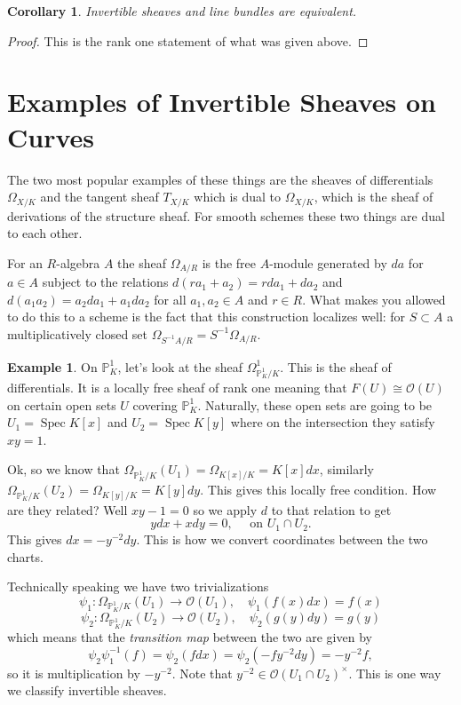 \documentclass[12pt]{article}
\numberwithin{equation}{section}
\newtheorem{corollary}[theorem]{Corollary}
\theoremstyle{definition}
\newtheorem{example}[theorem]{Example}
\theoremstyle{remark}
\newcommand{\Ocal}{\mathcal{O}}
\newcommand{\PP}{\mathbb{P}}
\newcommand{\Spec}{\operatorname{Spec}}
\begin{document}
\begin{corollary}
	Invertible sheaves and line bundles are equivalent.
\end{corollary}
\begin{proof}
	This is the rank one statement of what was given above.
\end{proof}

\section{Examples of Invertible Sheaves on Curves}
The two most popular examples of these things are the sheaves of differentials $\Omega_{X/K}$ and the tangent sheaf $T_{X/K}$ which is dual to $\Omega_{X/K}$, which is the sheaf of derivations of the structure sheaf. 
For smooth schemes these two things are dual to each other.

For an $R$-algebra $A$ the sheaf $\Omega_{A/R}$ is the free $A$-module generated by $da$ for $a \in A$ subject to the relations $d(ra_1+a_2)=rda_1+da_2$ and $d(a_1a_2) = a_2da_1 + a_1 da_2$ for all $a_1,a_2 \in A$ and $r\in R$. 
What makes you allowed to do this to a scheme is the fact that this construction localizes well: for $S\subset A$ a multiplicatively closed set $\Omega_{S^{-1}A/R} = S^{-1} \Omega_{A/R}$.

\begin{example}\label{example:omega-on-p1}
	On $\PP^1_K$, let's look at the sheaf $\Omega^1_{\PP^1_K/K}$.
	This is the sheaf of differentials.
	It is a locally free sheaf of rank one meaning that $F(U) \cong \Ocal(U)$ on certain open sets $U$ covering $\PP^1_K$.
	Naturally, these open sets are going to be $U_1 = \Spec K[x]$ and $U_2 = \Spec K[y]$ where on the intersection they satisfy $xy=1$.
	
	Ok, so we know that $\Omega_{\PP^1_K/K}(U_1) = \Omega_{K[x]/K}=K[x]dx$, similarly $\Omega_{\PP^1_K/K}(U_2) = \Omega_{K[y]/K} = K[y]dy$.
	This gives this locally free condition.
	How are they related?
	Well $xy-1=0$ so we apply $d$ to that relation to get 
	 $$ ydx + x dy =0, \quad \mbox{ on } U_1 \cap U_2. $$
	 This gives $dx = -y^{-2} dy$.
	 This is how we convert coordinates between the two charts.
	 
	 Technically speaking we have two trivializations 
	  $$\psi_1: \Omega_{\PP^1_K/K}(U_1) \to \Ocal(U_1), \quad \psi_1(f(x) dx)=f(x)$$
	  $$\psi_2:\Omega_{\PP^1_K/K}(U_2) \to \Ocal(U_2), \quad \psi_2(g(y) dy) =g(y)$$
	 which means that the \emph{transition map} between the two are given by 
	  $$ \psi_2\psi_1^{-1}(f ) = \psi_2( f dx ) = \psi_2( -f y^{-2} dy ) = -y^{-2} f ,$$
	  so it is multiplication by $-y^{-2}$.
	  Note that $y^{-2} \in \Ocal(U_1\cap U_2)^{\times}$. 
	  This is one way we classify invertible sheaves.
\end{example}
\end{document}
